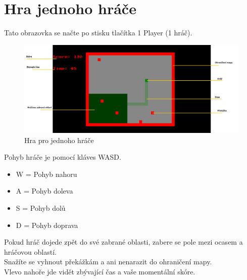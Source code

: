 \documentclass[12pt,a4paper]{report}
\begin{document}
\section{Hra jednoho hráče}
Tato obrazovka se načte po stisku tlačítka 1 Player (1 hráč).
\begin{figure}[H]
    \centering
    \includegraphics[width=\textwidth]{images/onePlayerGame_desc.png}
    \caption{Hra pro jednoho hráče}
\end{figure}
Pohyb hráče je pomocí kláves WASD.
\begin{itemize}
    \item W = Pohyb nahoru
    \item A = Pohyb doleva
    \item S = Pohyb dolů
    \item D = Pohyb doprava
\end{itemize}
Pokud hráč dojede zpět do své zabrané oblasti, zabere se pole mezi ocasem a hráčovou oblastí. \\
Snažíte se vyhnout překážkám a ani nenarazit do ohraničení mapy. \\
Vlevo nahoře jde vidět zbývající čas a vaše momentální skóre.
\newpage
\end{document}
